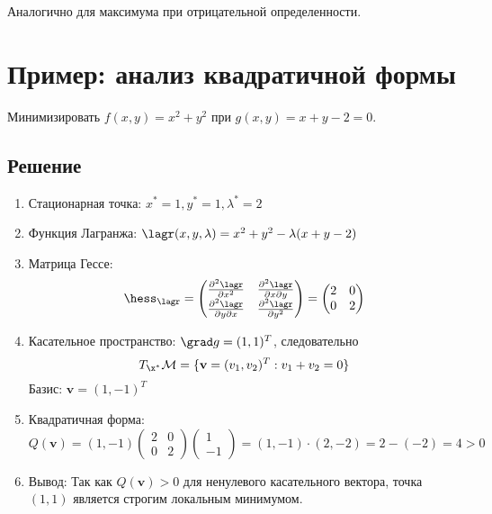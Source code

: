 Аналогично для максимума при отрицательной определенности.

\section*{Пример: анализ квадратичной формы}
Минимизировать $f(x,y) = x^2 + y^2$ при $g(x,y) = x + y - 2 = 0$.

\subsection*{Решение}
\begin{enumerate}
    \item Стационарная точка: $x^*=1, y^*=1, \lambda^*=2$
    
    \item Функция Лагранжа: $\lagr(x,y,\lambda) = x^2 + y^2 - \lambda(x + y - 2)$
    
    \item Матрица Гессе:
    \[
    \hess_{\lagr} = \begin{pmatrix}
    \frac{\partial^2 \lagr}{\partial x^2} & \frac{\partial^2 \lagr}{\partial x \partial y} \\
    \frac{\partial^2 \lagr}{\partial y \partial x} & \frac{\partial^2 \lagr}{\partial y^2}
    \end{pmatrix} = 
    \begin{pmatrix}
    2 & 0 \\
    0 & 2
    \end{pmatrix}
    \]
    
    \item Касательное пространство: $\grad g = (1,1)^T$, следовательно
    \[
    T_{\x^*}\mathcal{M} = \{ \mathbf{v} = (v_1, v_2)^T : v_1 + v_2 = 0 \}
    \]
    Базис: $\mathbf{v} = (1,-1)^T$
    
    \item Квадратичная форма:
    \[
    Q(\mathbf{v}) = (1, -1) \begin{pmatrix} 2 & 0 \\ 0 & 2 \end{pmatrix} \begin{pmatrix} 1 \\ -1 \end{pmatrix} = 
    (1, -1) \cdot (2, -2) = 2 - (-2) = 4 > 0
    \]
    
    \item Вывод: Так как $Q(\mathbf{v}) > 0$ для ненулевого касательного вектора, точка $(1,1)$ является строгим локальным минимумом.
\end{enumerate}

